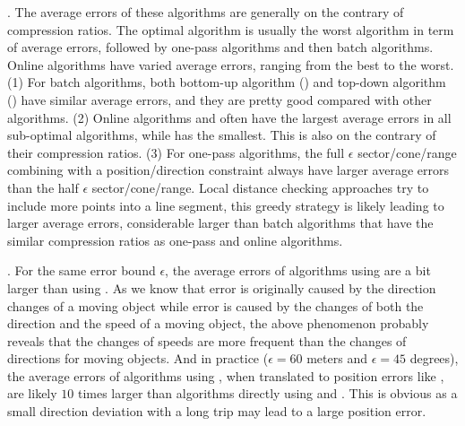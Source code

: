. The average errors of these algorithms  are generally on the contrary of compression ratios. The optimal algorithm is usually  the worst algorithm in term of average errors, followed by one-pass algorithms and then batch algorithms.
Online algorithms have varied average errors, ranging from the best to the worst.
(1) For batch algorithms, both bottom-up algorithm (\tpa) and top-down algorithm (\dpa) have similar average errors, and they are pretty good compared with other algorithms.
%
(2) Online algorithms \bqsa and \opwa often have the largest average errors in all sub-optimal algorithms, while \squishe has the smallest. This is also on the contrary of their compression ratios.
%
(3) For one-pass algorithms, the full $\epsilon$ sector/cone/range combining with a position/direction constraint always have larger average errors than the half $\epsilon$ sector/cone/range.
%
Local distance checking approaches try to include more points into a line segment, this greedy strategy is likely leading to larger average errors, considerable larger than batch algorithms that have the similar compression ratios as one-pass and online algorithms.




.
For the same error bound $\epsilon$, the average errors of algorithms using \sed are a bit larger than using \ped. {As we know that \ped error is originally caused by the direction changes of a moving object while \sed error is caused by the changes of both the direction and the speed of a moving object, the above phenomenon probably reveals that the changes of speeds are more frequent than the changes of directions for moving objects.}
%
And in practice (\eg $\epsilon = 60$ meters and $\epsilon = 45$ degrees), the average errors of algorithms using \dad, when translated to position errors like \ped, are likely $10$ times larger than algorithms directly using \ped and \sed. This is obvious as a small direction deviation with a long trip may lead to a large position error.










